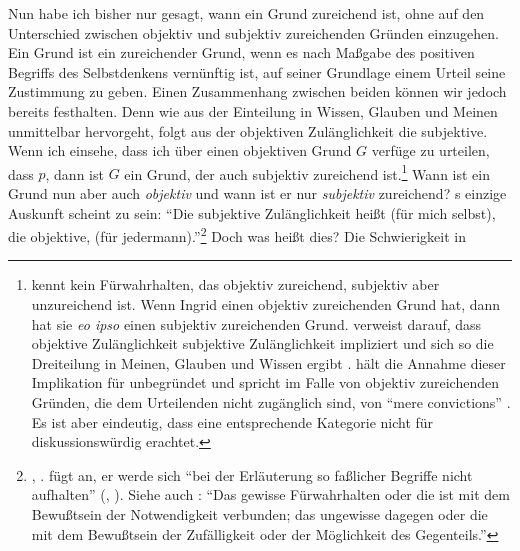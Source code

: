 Nun habe ich bisher nur gesagt, wann ein Grund zureichend ist, ohne auf den
Unterschied zwischen objektiv und subjektiv zureichenden Gründen einzugehen.
Ein Grund ist ein zureichender Grund, wenn es nach Maßgabe des
positiven Begriffs des Selbstdenkens vernünftig ist, auf seiner Grundlage einem
Urteil seine Zustimmung zu geben. Einen Zusammenhang zwischen beiden können wir jedoch bereits festhalten. Denn
wie aus der Einteilung in Wissen, Glauben und Meinen unmittelbar hervorgeht,
folgt aus der objektiven Zulänglichkeit die subjektive. Wenn ich einsehe, dass
ich über einen objektiven Grund $G$ verfüge zu urteilen, dass $p$, dann ist $G$
ein Grund, der auch subjektiv zureichend ist.\footnote{ kennt kein Fürwahrhalten, das
objektiv zureichend, subjektiv aber unzureichend ist. Wenn Ingrid einen objektiv
zureichenden Grund hat, dann hat sie \emph{eo ipso} einen subjektiv zureichenden
Grund.  verweist
darauf, dass objektive Zulänglichkeit subjektive Zulänglichkeit impliziert und sich so
die Dreiteilung in Meinen, Glauben und Wissen ergibt
\parencite[vgl.][78]{Stevenson:OpinionBelieforFaithandKnowledge2003}.
 hält die Annahme dieser Implikation
für unbegründet und spricht im Falle von objektiv zureichenden Gründen, die dem
Urteilenden nicht zugänglich sind, von \enquote{mere convictions}
\parencite[vgl.][\pno~331\,f.]{Chignell:BeliefinKant2007}. Es ist aber
eindeutig, dass  eine entsprechende Kategorie nicht für
diskussionswürdig erachtet.}
Wann ist ein Grund nun aber auch \emph{objektiv}
und wann ist er nur \emph{subjektiv} zureichend? s einzige
Auskunft scheint zu sein: \enquote{Die subjektive Zulänglichkeit heißt
 (für mich selbst), die objektive,  (für jedermann).}\footnote{\cite[][B
850]{Kant:KritikderreinenVernunft2003}, \cite[][III:
533.5--7]{Kant:GesammelteWerke1900ff.}.  fügt an, er werde
sich \enquote{bei der Erläuterung so faßlicher Begriffe nicht aufhalten}
\mkbibparens{\cite[][B 850]{Kant:KritikderreinenVernunft2003}, \cite[][III:
533.7--8]{Kant:GesammelteWerke1900ff.}}. Siehe auch \cite[][A
98\,f.,]{Kant:ImmanuelKantsLogik1977} \cite[][IX:
66.4--7]{Kant:GesammelteWerke1900ff.}: \enquote{Das gewisse Fürwahrhalten oder
die  ist mit dem Bewußtsein der Notwendigkeit verbunden; das
ungewisse dagegen oder die  mit dem Bewußtsein der Zufälligkeit
oder der Möglichkeit des Gegenteils.}} Doch was heißt dies? Die Schwierigkeit in
